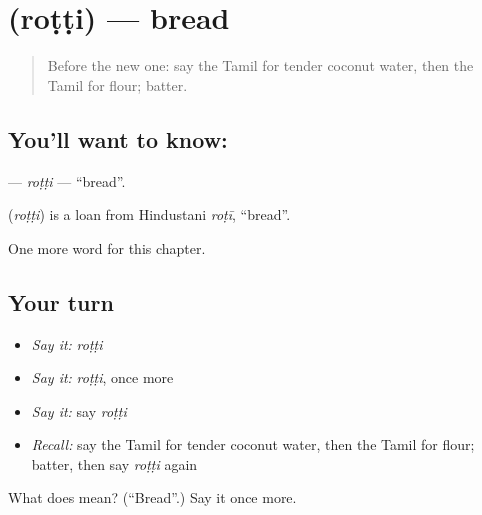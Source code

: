 \section[\texorpdfstring{\ta{ரொட்டி} (roṭṭi)}{ரொட்டி (roṭṭi)}]{ (roṭṭi) — bread}

\label{lesson:TA-C214-rotti}



\begin{quote}
Before the new one: say the Tamil for tender coconut water, then the Tamil for flour; batter.
\end{quote}

\subsection*{You'll want to know: }
\textbf{} — \emph{roṭṭi} — \textquotedblleft{}bread\textquotedblright{}.

\begin{cousinweb}
\textbf{} (\emph{roṭṭi}) is a loan from Hindustani \emph{roṭī}, \textquotedblleft{}bread\textquotedblright{}.
\end{cousinweb}

\begin{grammarlens}[title={What you've built}]
One more word for this chapter.
\end{grammarlens}

\subsection*{Your turn}
\begin{itemize}
\raggedright
  \item \emph{Say it:} \emph{roṭṭi}
  \item \emph{Say it:} \emph{roṭṭi}, once more
  \item \emph{Say it:} say \emph{roṭṭi}
  \item \emph{Recall:} say the Tamil for tender coconut water, then the Tamil for flour; batter, then say \emph{roṭṭi} again
\end{itemize}

\begin{tcolorbox}[breakable,colback=teal!4,colframe=teal!35!black,title={Before you move on}]
What does  mean? (\textquotedblleft{}Bread\textquotedblright{}.) Say it once more.
\end{tcolorbox}

